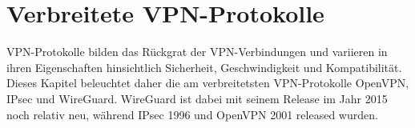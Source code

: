 \chapter{Verbreitete VPN-Protokolle} \label{intro-protokolle}
\gls{VPN}-Protokolle bilden das Rückgrat der \gls{VPN}-Verbindungen und variieren in ihren Eigenschaften hinsichtlich Sicherheit, Geschwindigkeit und Kompatibilität. Dieses Kapitel beleuchtet daher die am verbreitetsten \gls{VPN}-Protokolle OpenVPN, \gls{IPsec} und WireGuard. WireGuard ist dabei mit seinem Release im Jahr 2015 noch relativ neu, während \gls{IPsec} 1996 und OpenVPN 2001 released wurden.